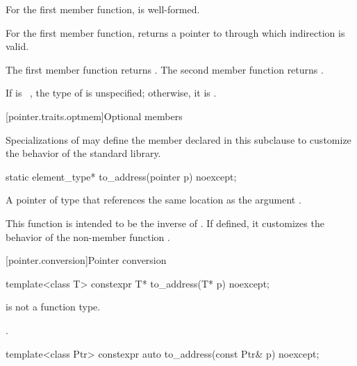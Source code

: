 \begin{itemdescr}
\pnum
\mandates
For the first member function,
 is well-formed.

\pnum
\expects
For the first member function,
 returns a pointer to 
through which indirection is valid.

\pnum
\returns
The first member function returns .
The second member function returns .

\pnum
\remarks
If  is \cv{}~, the type of
 is unspecified; otherwise, it is .
\end{itemdescr}

[pointer.traits.optmem]{Optional members}

\pnum
Specializations of  may define the member declared
in this subclause to customize the behavior of the standard library.

%
\begin{itemdecl}
static element_type* to_address(pointer p) noexcept;
\end{itemdecl}

\begin{itemdescr}
\pnum
\returns
A pointer of type  that references
the same location as the argument .

\pnum
\begin{note}
This function is intended to be the inverse of .
If defined, it customizes the behavior of
the non-member function
.
\end{note}
\end{itemdescr}

[pointer.conversion]{Pointer conversion}

%
\begin{itemdecl}
template<class T> constexpr T* to_address(T* p) noexcept;
\end{itemdecl}

\begin{itemdescr}
\pnum
\mandates
{} is not a function type.

\pnum
\returns
{}.
\end{itemdescr}

%
\begin{itemdecl}
template<class Ptr> constexpr auto to_address(const Ptr& p) noexcept;
\end{itemdecl}

